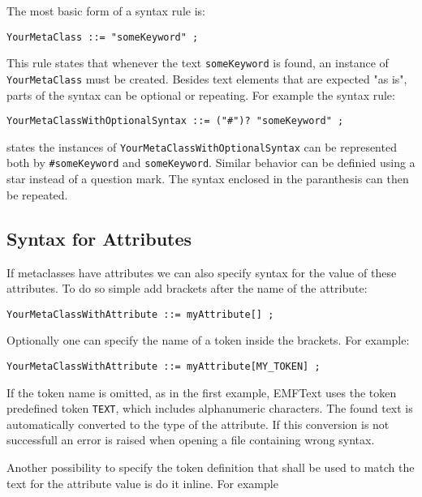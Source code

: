 The most basic form of a syntax rule is:

\begin{lstlisting}
YourMetaClass ::= "someKeyword" ;
\end{lstlisting}

This rule states that whenever the text \texttt{someKeyword} is found, an
instance of \texttt{YourMetaClass} must be created. Besides text elements that are
expected "as is", parts of the syntax can be optional or repeating. For example 
the syntax rule:

\begin{lstlisting}
YourMetaClassWithOptionalSyntax ::= ("#")? "someKeyword" ;
\end{lstlisting}

states the instances of \texttt{YourMetaClassWithOptionalSyntax} can be
represented both by \texttt{\#someKeyword} and \texttt{someKeyword}. Similar
behavior can be definied using a star instead of a question mark. The syntax 
enclosed in the paranthesis can then be repeated.

\subsection{Syntax for Attributes}

If metaclasses have attributes we can also specify syntax for the value of these 
attributes. To do so simple add brackets after the name of the attribute:

\begin{lstlisting}
YourMetaClassWithAttribute ::= myAttribute[] ;
\end{lstlisting}

Optionally one can specify the name of a token inside the brackets. For example:

\begin{lstlisting}
YourMetaClassWithAttribute ::= myAttribute[MY_TOKEN] ;
\end{lstlisting}

If the token name is omitted, as in the first example, EMFText uses the token
predefined token \texttt{TEXT}, which includes alphanumeric characters. The
found text is automatically converted to the type of the attribute. If this 
conversion is not successfull an error is raised when opening a file containing 
wrong syntax.

Another possibility to specify the token definition that shall be used to match 
the text for the attribute value is do it inline. For example

